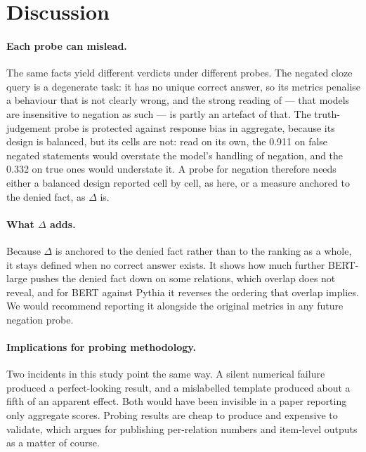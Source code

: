 \documentclass{article}
\begin{document}
\section{Discussion}
\label{sec:discussion}

\paragraph{Each probe can mislead.} The same facts yield different verdicts under
different probes. The negated cloze query is a degenerate
task: it has no unique correct answer, so its metrics penalise a behaviour that is not clearly wrong,
and the strong reading of \citet{kassner2020} --- that models are insensitive to negation as such ---
is partly an artefact of that. The truth-judgement probe is protected against response bias in aggregate, because its design is balanced, but its cells are not: read on its own, the 0.911 on false negated statements would overstate the model's handling of negation, and the 0.332 on true ones would understate it. A probe for negation therefore needs either a balanced design reported cell by cell, as
here, or a measure anchored to the denied fact, as $\Delta$ is.

\paragraph{What $\Delta$ adds.} Because $\Delta$ is anchored to the denied fact rather than to the
ranking as a whole, it stays defined when no correct answer exists. It shows how much further BERT-large pushes the denied fact down on some relations, which overlap does not reveal, and for BERT against Pythia it reverses the ordering that overlap implies.
We would recommend reporting it alongside the original metrics in any future negation probe.

\paragraph{Implications for probing methodology.} Two incidents in this study point the same way. A
silent numerical failure produced a perfect-looking result, and a mislabelled template produced about a
fifth of an apparent effect. Both would have been invisible in a paper reporting only aggregate
scores. Probing results are cheap to produce and expensive to validate, which argues for publishing
per-relation numbers and item-level outputs as a matter of course.
\end{document}
